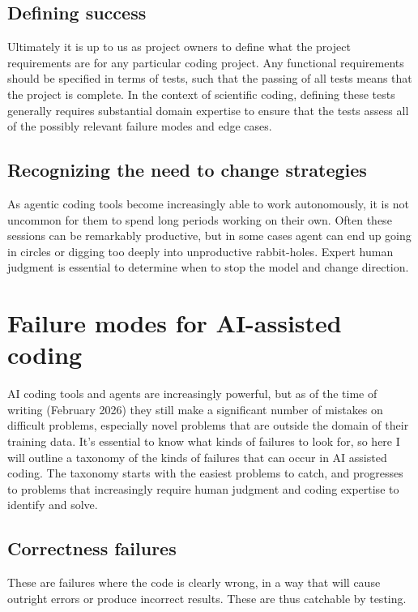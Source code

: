 \subsection{Defining success}

Ultimately it is up to us as project owners to define what the project requirements are for any particular coding project. Any functional requirements should be specified in terms of tests, such that the passing of all tests means that the project is complete.  In the context of scientific coding, defining these tests generally requires substantial domain expertise to ensure that the tests assess all of the possibly relevant failure modes and edge cases.

\subsection{Recognizing the need to change strategies}

As agentic coding tools become increasingly able to work autonomously, it is not uncommon for them to spend long periods working on their own.  Often these sessions can be remarkably productive, but in some cases agent can end up going in circles or digging too deeply into unproductive rabbit-holes.  Expert human judgment is essential to determine when to stop the model and change direction.

\section{Failure modes for AI-assisted coding}

AI coding tools and agents are increasingly powerful, but as of the time of writing (February 2026) they still make a significant number of mistakes on difficult problems, especially novel problems that are outside the domain of their training data.  It's essential to know what kinds of failures to look for, so here I will outline a taxonomy of the kinds of failures that can occur in AI assisted coding.  The taxonomy starts with the easiest problems to catch, and progresses to problems that increasingly require human judgment and coding expertise to identify and solve.

\subsection{Correctness failures}

These are failures where the code is clearly wrong, in a way that will cause outright errors or produce incorrect results. These are thus catchable by testing.

